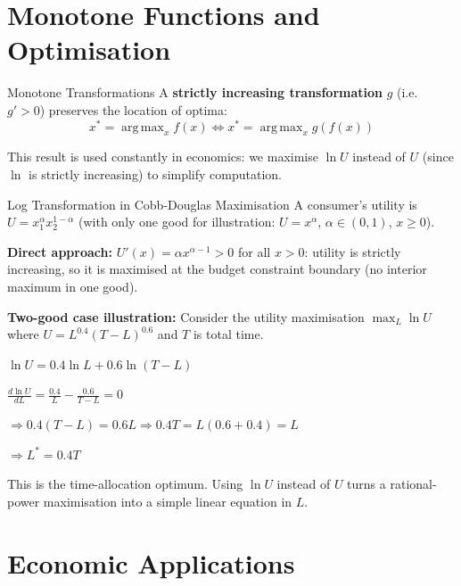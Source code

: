 \documentclass[12pt, a4paper]{article}
\theoremstyle{definition}
\DeclareMathOperator{\argmax}{arg\,max}
\begin{document}
\section{Monotone Functions and Optimisation}

\begin{defbox}{Monotone Transformations}
A \textbf{strictly increasing transformation} $g$ (i.e.\ $g' > 0$)
preserves the location of optima:
\[
  x^* = \argmax_{x} f(x) \iff x^* = \argmax_{x} g(f(x))
\]
\end{defbox}

This result is used constantly in economics: we maximise $\ln U$ instead of
$U$ (since $\ln$ is strictly increasing) to simplify computation.

\begin{exbox}{Log Transformation in Cobb-Douglas Maximisation}
A consumer's utility is $U = x_1^\alpha x_2^{1-\alpha}$ (with only one
good for illustration: $U = x^\alpha$, $\alpha \in (0,1)$, $x \geq 0$).

\textbf{Direct approach:} $U'(x) = \alpha x^{\alpha-1} > 0$ for all $x>0$:
utility is strictly increasing, so it is maximised at the budget constraint
boundary (no interior maximum in one good).

\textbf{Two-good case illustration:} Consider the utility maximisation
$\max_{L} \ln U$ where $U = L^{0.4}(T-L)^{0.6}$ and $T$ is total time.

$\ln U = 0.4\ln L + 0.6\ln(T-L)$

$\frac{d\ln U}{dL} = \frac{0.4}{L} - \frac{0.6}{T-L} = 0$

$\Rightarrow 0.4(T-L) = 0.6L \Rightarrow 0.4T = L(0.6+0.4) = L$

$\Rightarrow L^* = 0.4T$

This is the time-allocation optimum.  Using $\ln U$ instead of $U$ turns a
rational-power maximisation into a simple linear equation in $L$.
\end{exbox}

\section{Economic Applications}
\end{document}
